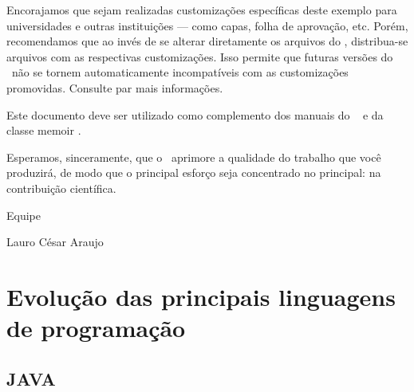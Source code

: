 \documentclass[
    12pt,               %
    openright,          %
    twoside,            %
    a4paper,            %
    brazil              %
    ]{abntex2}
\begin{document}
Encorajamos que sejam realizadas customizações específicas deste exemplo para
universidades e outras instituições --- como capas, folha de aprovação, etc.
Porém, recomendamos que ao invés de se alterar diretamente os arquivos do
\abnTeX, distribua-se arquivos com as respectivas customizações.
Isso permite que futuras versões do \abnTeX~não se tornem automaticamente
incompatíveis com as customizações promovidas. Consulte
 par mais informações.

Este documento deve ser utilizado como complemento dos manuais do \abnTeX\ 
\cite{abntex2classe,abntex2cite,abntex2cite-alf} e da classe \textsf{memoir}
\cite{memoir}. 

Esperamos, sinceramente, que o \abnTeX\ aprimore a qualidade do trabalho que
você produzirá, de modo que o principal esforço seja concentrado no principal:
na contribuição científica.

Equipe \abnTeX 

Lauro César Araujo


\part{Evolução das principais linguagens de programação}

\chapter{JAVA}
\end{document}
